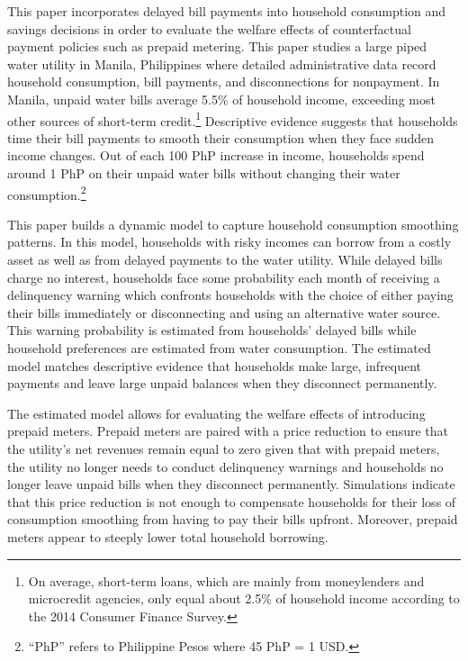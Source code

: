 \documentclass[12pt,table]{article}
\begin{document}
This paper incorporates delayed bill payments into household consumption and savings decisions in order to evaluate the welfare effects of counterfactual payment policies such as prepaid metering.  This paper studies a large piped water utility in Manila, Philippines where detailed administrative data record household consumption, bill payments, and disconnections for nonpayment.  In Manila, unpaid water bills average 5.5\% of household income, exceeding most other sources of short-term credit.\footnote{On average, short-term loans, which are mainly from moneylenders and microcredit agencies, only equal about 2.5\% of household income according to the 2014 Consumer Finance Survey.}  Descriptive evidence suggests that households time their bill payments to smooth their consumption when they face sudden income changes.  Out of each 100 PhP increase in income, households spend around 1 PhP on their unpaid water bills without changing their water consumption.\footnote{``PhP'' refers to Philippine Pesos where 45 PhP = 1 USD.}

This paper builds a dynamic model to capture household consumption smoothing patterns.  In this model, households with risky incomes can borrow from a costly asset as well as from delayed payments to the water utility.  While delayed bills charge no interest, households face some probability each month of receiving a delinquency warning which confronts households with the choice of either paying their bills immediately or disconnecting and using an alternative water source.  This warning probability is estimated from households' delayed bills while household preferences are estimated from water consumption.  The estimated model matches descriptive evidence that households make large, infrequent payments and leave large unpaid balances when they disconnect permanently.

The estimated model allows for evaluating the welfare effects of introducing prepaid meters.  Prepaid meters are paired with a price reduction to ensure that the utility's net revenues remain equal to zero given that with prepaid meters, the utility no longer needs to conduct delinquency warnings and households no longer leave unpaid bills when they disconnect permanently.  Simulations indicate that this price reduction is not enough to compensate households for their loss of consumption smoothing from having to pay their bills upfront.  Moreover, prepaid meters appear to steeply lower total household borrowing.
\end{document}
